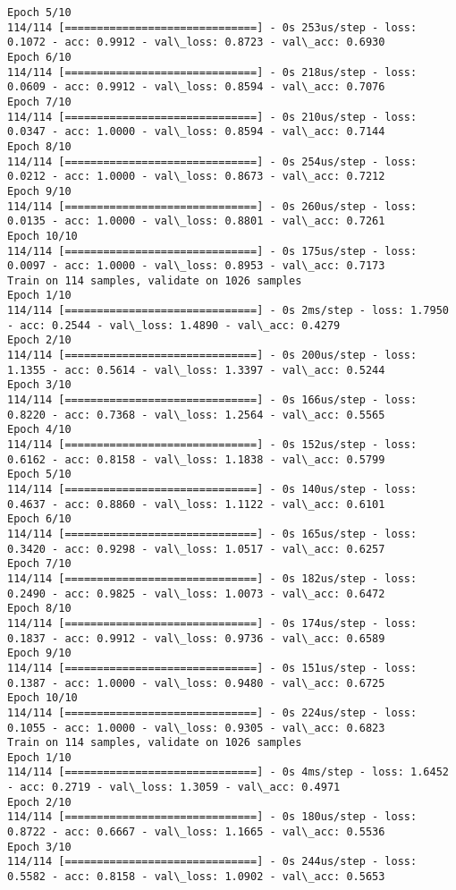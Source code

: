 \documentclass[11pt]{article}
\begin{document}
\begin{Verbatim}[commandchars=\\\{\}]
Epoch 5/10
114/114 [==============================] - 0s 253us/step - loss: 0.1072 - acc: 0.9912 - val\_loss: 0.8723 - val\_acc: 0.6930
Epoch 6/10
114/114 [==============================] - 0s 218us/step - loss: 0.0609 - acc: 0.9912 - val\_loss: 0.8594 - val\_acc: 0.7076
Epoch 7/10
114/114 [==============================] - 0s 210us/step - loss: 0.0347 - acc: 1.0000 - val\_loss: 0.8594 - val\_acc: 0.7144
Epoch 8/10
114/114 [==============================] - 0s 254us/step - loss: 0.0212 - acc: 1.0000 - val\_loss: 0.8673 - val\_acc: 0.7212
Epoch 9/10
114/114 [==============================] - 0s 260us/step - loss: 0.0135 - acc: 1.0000 - val\_loss: 0.8801 - val\_acc: 0.7261
Epoch 10/10
114/114 [==============================] - 0s 175us/step - loss: 0.0097 - acc: 1.0000 - val\_loss: 0.8953 - val\_acc: 0.7173
Train on 114 samples, validate on 1026 samples
Epoch 1/10
114/114 [==============================] - 0s 2ms/step - loss: 1.7950 - acc: 0.2544 - val\_loss: 1.4890 - val\_acc: 0.4279
Epoch 2/10
114/114 [==============================] - 0s 200us/step - loss: 1.1355 - acc: 0.5614 - val\_loss: 1.3397 - val\_acc: 0.5244
Epoch 3/10
114/114 [==============================] - 0s 166us/step - loss: 0.8220 - acc: 0.7368 - val\_loss: 1.2564 - val\_acc: 0.5565
Epoch 4/10
114/114 [==============================] - 0s 152us/step - loss: 0.6162 - acc: 0.8158 - val\_loss: 1.1838 - val\_acc: 0.5799
Epoch 5/10
114/114 [==============================] - 0s 140us/step - loss: 0.4637 - acc: 0.8860 - val\_loss: 1.1122 - val\_acc: 0.6101
Epoch 6/10
114/114 [==============================] - 0s 165us/step - loss: 0.3420 - acc: 0.9298 - val\_loss: 1.0517 - val\_acc: 0.6257
Epoch 7/10
114/114 [==============================] - 0s 182us/step - loss: 0.2490 - acc: 0.9825 - val\_loss: 1.0073 - val\_acc: 0.6472
Epoch 8/10
114/114 [==============================] - 0s 174us/step - loss: 0.1837 - acc: 0.9912 - val\_loss: 0.9736 - val\_acc: 0.6589
Epoch 9/10
114/114 [==============================] - 0s 151us/step - loss: 0.1387 - acc: 1.0000 - val\_loss: 0.9480 - val\_acc: 0.6725
Epoch 10/10
114/114 [==============================] - 0s 224us/step - loss: 0.1055 - acc: 1.0000 - val\_loss: 0.9305 - val\_acc: 0.6823
Train on 114 samples, validate on 1026 samples
Epoch 1/10
114/114 [==============================] - 0s 4ms/step - loss: 1.6452 - acc: 0.2719 - val\_loss: 1.3059 - val\_acc: 0.4971
Epoch 2/10
114/114 [==============================] - 0s 180us/step - loss: 0.8722 - acc: 0.6667 - val\_loss: 1.1665 - val\_acc: 0.5536
Epoch 3/10
114/114 [==============================] - 0s 244us/step - loss: 0.5582 - acc: 0.8158 - val\_loss: 1.0902 - val\_acc: 0.5653

\end{Verbatim}
\end{document}
